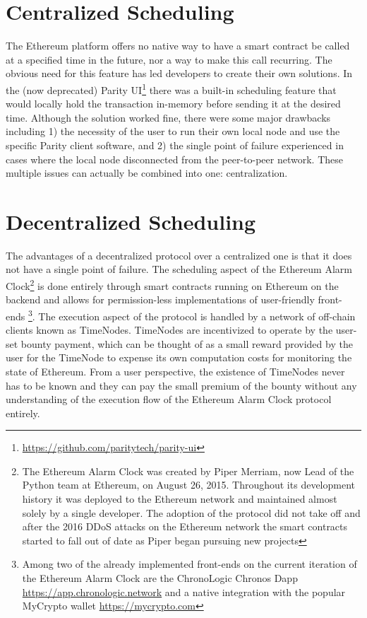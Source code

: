 \documentclass{report}
\begin{document}
  \section{Centralized Scheduling}
  The Ethereum platform offers no native way to have a smart contract be called at a specified time in the future, nor a way to make this call recurring. The obvious need for this feature has led developers to create their own solutions. In the (now deprecated) Parity UI\footnote{\url{https://github.com/paritytech/parity-ui}} there was a built-in scheduling feature that would locally hold the transaction in-memory before sending it at the desired time. Although the solution worked fine, there were some major drawbacks including 1) the necessity of the user to run their own local node and use the specific Parity client software, and 2) the single point of failure experienced in cases where the local node disconnected from the peer-to-peer network. These multiple issues can actually be combined into one: centralization.
  \section{Decentralized Scheduling}
  The advantages of a decentralized protocol over a centralized one is that it does not have a single point of failure. The scheduling aspect of the Ethereum Alarm Clock\footnote{The Ethereum Alarm Clock was created by Piper Merriam, now Lead of the Python team at Ethereum, on August 26, 2015. Throughout its development history it was deployed to the Ethereum network and maintained almost solely by a single developer. The adoption of the protocol did not take off and after the 2016 DDoS attacks on the Ethereum network the smart contracts started to fall out of date as Piper began pursuing new projects} is done entirely through smart contracts running on Ethereum on the backend and allows for permission-less implementations of user-friendly front-ends \footnote{Among two of the already implemented front-ends on the current iteration of the Ethereum Alarm Clock are the ChronoLogic Chronos Dapp \url{https://app.chronologic.network} and a native integration with the popular MyCrypto wallet \url{https://mycrypto.com}}. The execution aspect of the protocol is handled by a network of off-chain clients known as TimeNodes. TimeNodes are incentivized to operate by the user-set bounty payment, which can be thought of as a small reward provided by the user for the TimeNode to expense its own computation costs for monitoring the state of Ethereum. From a user perspective, the existence of TimeNodes never has to be known and they can pay the small premium of the bounty without any understanding of the execution flow of the Ethereum Alarm Clock protocol entirely.
\end{document}
